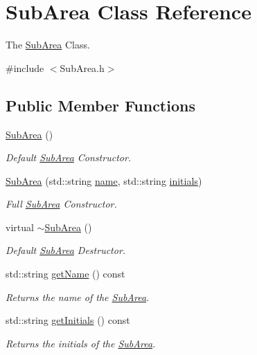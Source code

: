 \hypertarget{classSubArea}{}\section{Sub\+Area Class Reference}
\label{classSubArea}


The \hyperlink{classSubArea}{Sub\+Area} Class.  




{\ttfamily \#include $<$Sub\+Area.\+h$>$}

\subsection*{Public Member Functions}
\begin{DoxyCompactItemize}
\item 
\hyperlink{classSubArea_a9649b113a07cc887aec5bdf83b75666c}{Sub\+Area} ()
\begin{DoxyCompactList}\small\item\em Default \hyperlink{classSubArea}{Sub\+Area} Constructor. \end{DoxyCompactList}\item 
\hyperlink{classSubArea_a27e357e4c5765eb3128fdde5cdf690e3}{Sub\+Area} (std\+::string \hyperlink{classSubArea_aa1b0997da15caea7144ae73963da9f82}{name}, std\+::string \hyperlink{classSubArea_a3e0a456f5ce325e2a778a17d1929b5d0}{initials})
\begin{DoxyCompactList}\small\item\em Full \hyperlink{classSubArea}{Sub\+Area} Constructor. \end{DoxyCompactList}\item 
virtual \hyperlink{classSubArea_a0423d8d6d9f297cc1ceff557279d9be8}{$\sim$\+Sub\+Area} ()
\begin{DoxyCompactList}\small\item\em Default \hyperlink{classSubArea}{Sub\+Area} Destructor. \end{DoxyCompactList}\item 
std\+::string \hyperlink{classSubArea_a8370d762b413cb20c233cf0ca56315da}{get\+Name} () const
\begin{DoxyCompactList}\small\item\em Returns the name of the \hyperlink{classSubArea}{Sub\+Area}. \end{DoxyCompactList}\item 
std\+::string \hyperlink{classSubArea_a0385787547e85f2481bc0031e6c98f10}{get\+Initials} () const
\begin{DoxyCompactList}\small\item\em Returns the initials of the \hyperlink{classSubArea}{Sub\+Area}. \end{DoxyCompactList}\end{DoxyCompactItemize}
